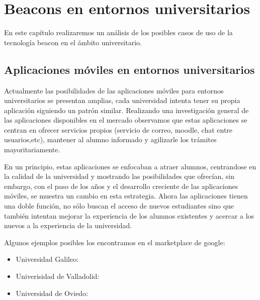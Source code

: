 %
%
%
%


\chapter{Beacons en entornos universitarios} \label{chap:BeaconsEntornosUniversitarios}  


En este capítulo realizaremos un análisis de los posibles casos de uso de la tecnología beacon en el ámbito universitario.

 
\section{Aplicaciones móviles en entornos universitarios}


Actualmente las posibilidades de las aplicaciones móviles para entornos universitarios se presentan amplias, cada universidad intenta tener su propia aplicación siguiendo un patrón similar. Realizando una investigación general de las aplicaciones disponibles en el mercado observamos que estas aplicaciones se centran en ofrecer servicios propios (servicio de correo, moodle, chat entre usuarios,etc), mantener al alumno informado y agilizarle los trámites mayoritariamente. 

En un principio, estas aplicaciones se enfocaban a atraer alumnos, centrandose en la calidad de la universidad y mostrando las posibilidades que ofrecían, sin embargo, con el paso de los años y el desarrollo creciente de las aplicaciones móviles, se muestra un cambio en esta estrategia. Ahora las aplicaciones tienen una doble función, no sólo buscan el acceso de nuevos estudiantes sino que también intentan mejorar la experiencia de los alumnos existentes y acercar a los nuevos a la experiencia de la universidad. 



Algunos ejemplos posibles los encontramos en el marketplace de google:

\begin{itemize}
\item Universidad Galileo: \cite{URL::galileo}
\item Univerisidad de Valladolid: \cite{URL::valladolid}
\item Universidad de Oviedo: \cite{URL::oviedo}
\end{itemize}


